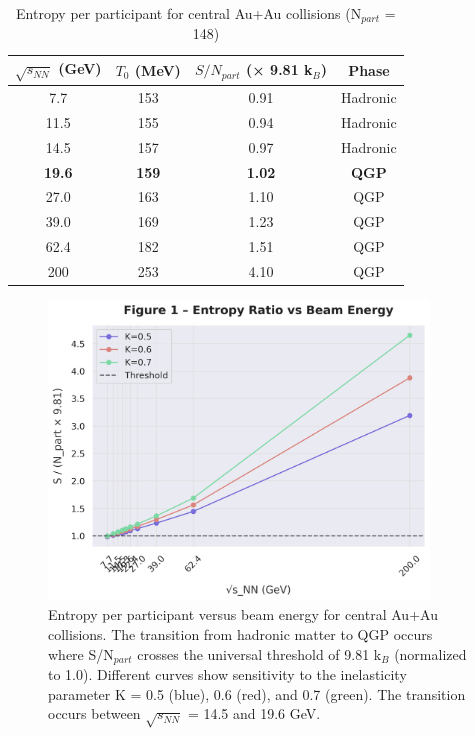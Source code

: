 \documentclass[12pt,a4paper]{article}
\begin{document}
\begin{table}[H]
\centering
\caption{Entropy per participant for central Au+Au collisions (N$_{part}$ = 148)}
\label{tab:results}
\begin{tabular}{|c|c|c|c|}
\hline
$\sqrt{s_{NN}}$ (GeV) & $T_0$ (MeV) & $S/N_{part}$ (× 9.81 k$_B$) & Phase \\
\hline
7.7   & 153 & 0.91 & Hadronic \\
11.5  & 155 & 0.94 & Hadronic \\
14.5  & 157 & 0.97 & Hadronic \\
\textbf{19.6}  & \textbf{159} & \textbf{1.02} & \textbf{QGP} \\
27.0  & 163 & 1.10 & QGP \\
39.0  & 169 & 1.23 & QGP \\
62.4  & 182 & 1.51 & QGP \\
200   & 253 & 4.10 & QGP \\
\hline
\end{tabular}
\end{table}

\begin{figure}[H]
\centering
\includegraphics[width=0.9\textwidth]{figures/figure1_entropy_ratio.png}
\caption{Entropy per participant versus beam energy for central Au+Au collisions. The transition from hadronic matter to QGP occurs where S/N$_{part}$ crosses the universal threshold of 9.81 k$_B$ (normalized to 1.0). Different curves show sensitivity to the inelasticity parameter K = 0.5 (blue), 0.6 (red), and 0.7 (green). The transition occurs between $\sqrt{s_{NN}}$ = 14.5 and 19.6 GeV.}
\label{fig:entropy_ratio}
\end{figure}
\end{document}
